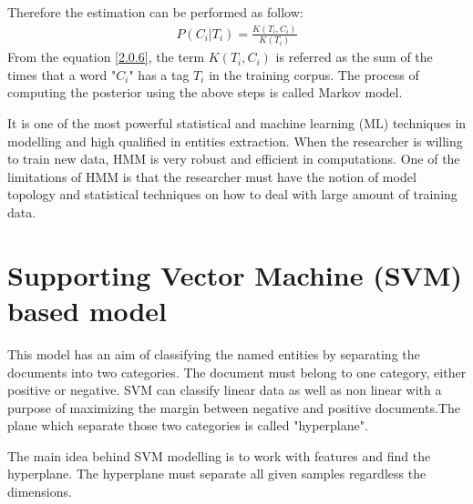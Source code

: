 Therefore the estimation can be performed as follow:
\begin{align}
P(C_{i}|T_{i}) =  \frac{K(T_{i},C_{i})}{K(T_{i})} \label{2.0.6}
\end{align}
From the equation \eqref{2.0.6}, the term $K(T_{i},C_{i})$  is referred as the sum of the times that a word "$C_{i}$" has a tag $T_{i}$ in the training corpus.
The process of computing the posterior using the above steps is called Markov model.

It is one of the most powerful statistical and machine learning (ML) techniques in modelling and high qualified in entities extraction. When the researcher is willing to train new data, HMM is very robust and efficient in computations.
One of the limitations of HMM is that the researcher must have the notion of model topology and statistical techniques on how to deal with large amount of training data.
\section{Supporting Vector Machine (SVM) based model}
This model has an aim of classifying the named entities by separating the documents into two categories.  The document must belong to one category, either positive or negative.  SVM can classify linear data as well as non linear with a purpose of maximizing the margin between negative and positive documents.The plane which separate those two categories is called "hyperplane".

The main idea behind SVM modelling is to work with features and find the hyperplane. The hyperplane must separate all given samples regardless the dimensions.
